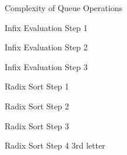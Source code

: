 \documentclass[letterpaper,10pt,english]{sphinxmanual}
\begin{document}
\begin{figure}[htbp]
\centering
\capstart

\noindent{}
\caption{Complexity of Queue Operations}\label{\detokenize{chap4/chap4:id14}}\end{figure}

\begin{figure}[htbp]
\centering
\capstart

\noindent{}
\caption{Infix Evaluation Step 1}\label{\detokenize{chap4/chap4:id15}}\end{figure}

\begin{figure}[htbp]
\centering
\capstart

\noindent{}
\caption{Infix Evaluation Step 2}\label{\detokenize{chap4/chap4:id16}}\end{figure}

\begin{figure}[htbp]
\centering
\capstart

\noindent{}
\caption{Infix Evaluation Step 3}\label{\detokenize{chap4/chap4:id17}}\end{figure}

\begin{figure}[htbp]
\centering
\capstart

\noindent{}
\caption{Radix Sort Step 1}\label{\detokenize{chap4/chap4:id18}}\end{figure}

\begin{figure}[htbp]
\centering
\capstart

\noindent{}
\caption{Radix Sort Step 2}\label{\detokenize{chap4/chap4:id19}}\end{figure}

\begin{figure}[htbp]
\centering
\capstart

\noindent{}
\caption{Radix Sort Step 3}\label{\detokenize{chap4/chap4:id20}}\end{figure}

\begin{figure}[htbp]
\centering
\capstart

\noindent{}
\caption{Radix Sort Step 4 \sphinxhyphen{} 3rd letter}\label{\detokenize{chap4/chap4:id21}}\end{figure}
\end{document}
